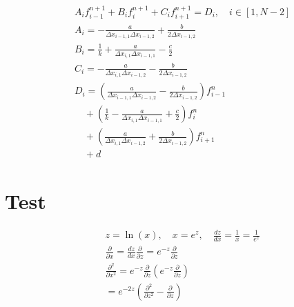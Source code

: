 \documentclass{article}
\begin{document}
    \begin{equation}
        \begin{split}
            &A_i f_{i-1}^{n+1} + B_i f_i^{n+1} + C_i f_{i+1}^{n+1} = D_i, \quad i \in [1,N-2]
            \\
            &A_i =
            -\frac{a}{\Delta x_{i-1,1} \Delta x_{i-1,2}} + \frac{b}{2 \Delta x_{i-1,2}}
            \\
            &B_i =
            \frac{1}{k} + \frac{a}{\Delta x_{i,1} \Delta x_{i-1,1}} - \frac{c}{2}
            \\
            &C_i =
            -\frac{a}{\Delta x_{i,1} \Delta x_{i-1,2}} - \frac{b}{2 \Delta x_{i-1,2}}
            \\
            &D_i =
            \left(\frac{a}{\Delta x_{i-1,1} \Delta x_{i-1,2}} - \frac{b}{2 \Delta x_{i-1,2}}
                \right) f_{i-1}^{n}
            \\
            &\quad + \left( \frac{1}{k} - \frac{a}{\Delta x_{i,1} \Delta x_{i-1,1}}
                + \frac{c}{2} \right) f_i^n
            \\
            &\quad + \left(\frac{a}{\Delta x_{i,1} \Delta x_{i-1,2}} +
                \frac{b}{2 \Delta x_{i-1,2}}\right) f_{i+1}^{n}
            \\
            &\quad + d
        \end{split}
    \end{equation}

\section{Test}
    \begin{equation}
        \begin{split}
            &z = \ln(x), \quad x = e^z, \quad \frac{dz}{dx} = \frac{1}{x} = \frac{1}{e^z}
            \\
            & \frac{\partial }{\partial x} = \frac{dz}{dx} \frac{\partial } {\partial z}
            = e^{-z} \frac{\partial }{\partial z}
            \\
            & \frac{\partial^2 }{\partial x^2} = e^{-z} \frac{\partial } {\partial z}
            \left(e^{-z} \frac{\partial }{\partial z}\right) 
            \\
            & = e^{-2z}\left( \frac{\partial^2}{\partial z^2} - \frac{\partial }{\partial z}
                       \right)
        \end{split}
    \end{equation}
\end{document}
